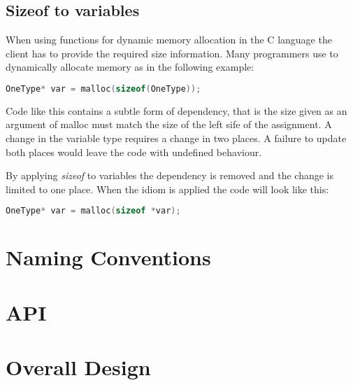 \subsection{Sizeof to variables}
When using functions for dynamic memory allocation in the C language the client has to provide the required size information. Many programmers use to dynamically allocate memory as in the following example:
\begin{lstlisting}[language=C]
OneType* var = malloc(sizeof(OneType));
\end{lstlisting}

Code like this contains a subtle form of dependency, that is the size given as an argument of malloc must match the size of the left sife of the assignment. A change in the variable type requires a change in two places. A failure to update both places would leave the code with undefined behaviour.

By applying \textit{sizeof} to variables the dependency is removed and the change is limited to one place. When the idiom is applied the code will look like this:
\begin{lstlisting}[language=C]
OneType* var = malloc(sizeof *var);
\end{lstlisting}

\section{Naming Conventions}

\section{API}

\section{Overall Design}
